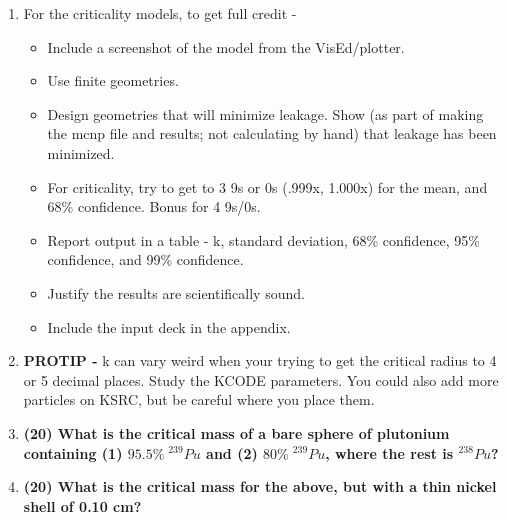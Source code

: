 \documentclass[11pt,a4paper]{article}
\begin{document}
\begin{enumerate}[leftmargin=*,topsep=0pt,font=\bfseries]
        \newpage 
    \item[] For the criticality models, to get full credit - 
        \begin{itemize}[leftmargin=*,topsep=0pt]
            \item Include a screenshot of the model from the VisEd/plotter.
            \item Use finite geometries.
            \item Design geometries that will minimize leakage. Show (as part of making the mcnp file and results; not calculating by hand) that leakage has been minimized.
            \item For criticality, try to get to 3 9s or 0s (.999x, 1.000x) for the mean, and 68\% confidence. Bonus for 4 9s/0s.
            \item Report output in a table - k, standard deviation, 68\% confidence, 95\% confidence, and 99\% confidence.
            \item Justify the results are scientifically sound.
            \item Include the input deck in the appendix.
        \end{itemize}
    \item[]\textbf{PROTIP - }k can vary weird when your trying to get the critical radius to 4 or 5 decimal places. Study the KCODE parameters. You could also add more particles on KSRC, but be careful where you place them.
        \newpage
    \item\textbf{(20) What is the critical mass of a bare sphere of plutonium containing (1) $95.5\% \; ^{239}Pu$ and (2) $80\% \; ^{239}Pu$, where the rest is $^{238}Pu$?}
        \vspace{0.25in}\\




















        \newpage 
    \item\textbf{(20) What is the critical mass for the above, but with a thin nickel shell of 0.10 cm?}
        \vspace{0.25in}\\

















\end{enumerate}
\end{document}
